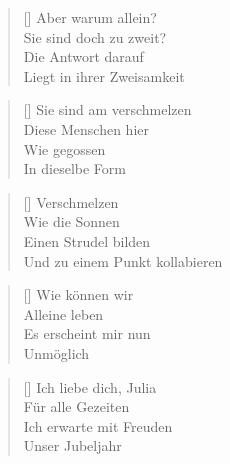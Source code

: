 \documentclass[twocolumn]{article}
\newenvironment{Strophe}{\begin{minipage}{\versewidth} \begin{verse}[\versewidth]}{\end{verse} \end{minipage}\vspace{0.5em}}
\begin{document}
	\begin{Strophe}	
		Aber warum allein? \\
		Sie sind doch zu zweit? \\
		Die Antwort darauf \\
		Liegt in ihrer Zweisamkeit \\
	\end{Strophe}
	
	\begin{Strophe}	
		Sie sind am verschmelzen \\
		Diese Menschen hier \\
		Wie gegossen \\
		In dieselbe Form \\
	\end{Strophe}
	
	\begin{Strophe}
		Verschmelzen \\
		Wie die Sonnen \\
		Einen Strudel bilden \\
		Und zu einem Punkt kollabieren \\
	\end{Strophe}
	
	\begin{Strophe}
		Wie können wir \\
		Alleine leben \\
		Es erscheint mir nun \\
		Unmöglich \\
	\end{Strophe}
	
	\begin{Strophe}
		Ich liebe dich, Julia \\
		Für alle Gezeiten \\
		Ich erwarte mit Freuden \\
		Unser Jubeljahr \\
	\end{Strophe}
\end{document}
